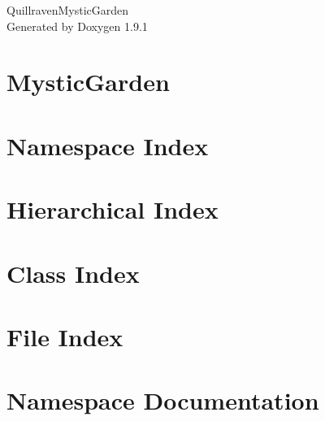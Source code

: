 \let\mypdfximage\pdfximage\def\pdfximage{\immediate\mypdfximage}\documentclass[twoside]{book}
\newcommand{\+}{\discretionary{\mbox{\scriptsize$\hookleftarrow$}}{}{}}
\newcommand{\clearemptydoublepage}{%
  \newpage{\pagestyle{empty}\cleardoublepage}%
}
\begin{document}
\raggedbottom

\hypersetup{pageanchor=false,
             bookmarksnumbered=true,
             pdfencoding=unicode
            }
\begin{titlepage}
\vspace*{7cm}
\begin{center}%
{\Large Quillraven\+Mystic\+Garden }\\
\vspace*{1cm}
{\large Generated by Doxygen 1.9.1}\\
\end{center}
\end{titlepage}
\clearemptydoublepage
{}
\tableofcontents
\clearemptydoublepage
{}
\hypersetup{pageanchor=true}

\chapter{Mystic\+Garden}
\label{md__c___git_hub__mystic_garden__r_e_a_d_m_e}

\chapter{Namespace Index}

\chapter{Hierarchical Index}

\chapter{Class Index}

\chapter{File Index}

\chapter{Namespace Documentation}













\end{document}
